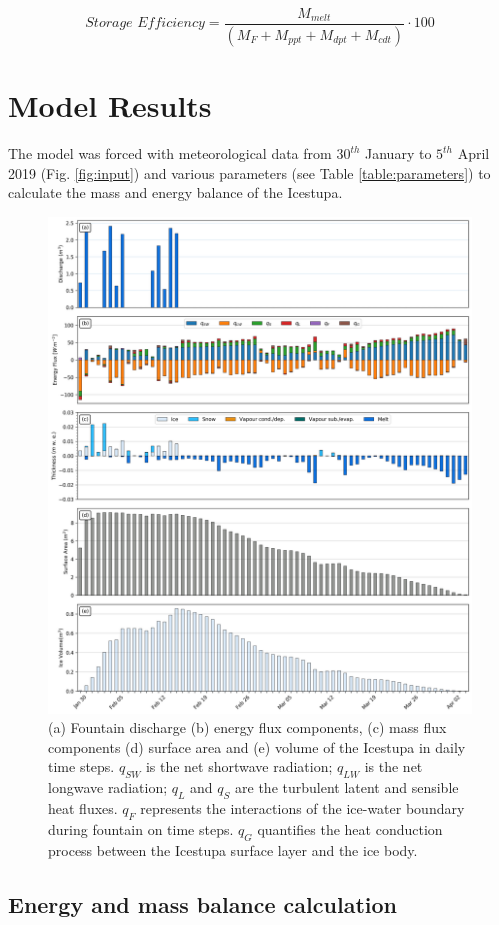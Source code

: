 \documentclass[utf8]{frontiersSCNS} %
\begin{document}
\begin{equation} \textit{Storage Efficiency} = \frac{M_{melt}}{(M_F+M_{ppt}+M_{dpt}+M_{cdt})} \cdot 100 \end{equation}


\section{Model Results} 
The model was forced with meteorological data from $30^{th}$ January to $5^{th}$ April 2019 (Fig.
\ref{fig:input}) and various parameters (see Table \ref{table:parameters}) to calculate the mass and energy balance of
the Icestupa.

\begin{figure} \begin{center} \includegraphics[width=\linewidth]{Figures/Figure_6.jpg} \end{center}
\caption{(a) Fountain discharge (b) energy flux components, (c) mass flux components (d) surface area and (e) volume of
  the Icestupa in daily time steps.  $q_{SW}$ is the net shortwave radiation; $q_{LW}$ is the net longwave radiation;
  $q_{L}$ and $q_{S}$ are the turbulent latent and sensible heat fluxes. $q_{F}$ represents the interactions of the
  ice-water boundary during fountain on time steps.  $q_{G}$ quantifies the heat conduction process between the
  Icestupa surface layer and the ice body. } \label{fig:EB} \end{figure} \subsection{Energy and mass balance
calculation}
\end{document}
